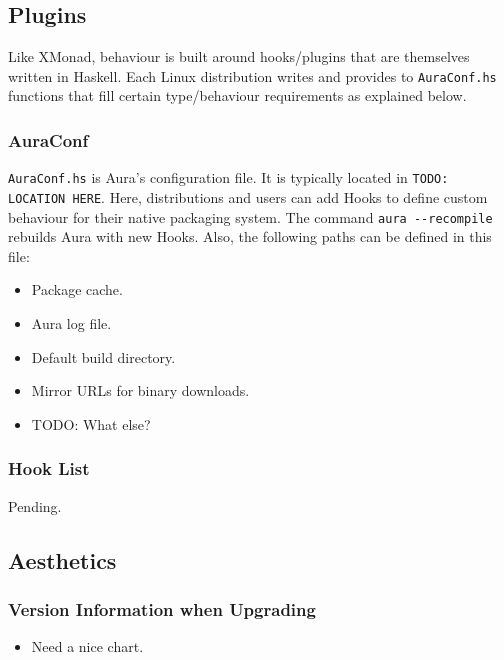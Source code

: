 \documentclass{article}
\begin{document}
\subsection{Plugins}\label{plugins}

Like XMonad, behaviour is built around hooks/plugins that are themselves
written in Haskell. Each Linux distribution writes and provides to
\texttt{AuraConf.hs} functions that fill certain type/behaviour
requirements as explained below.

\subsubsection{AuraConf}\label{auraconf}

\texttt{AuraConf.hs} is Aura's configuration file. It is typically
located in \texttt{TODO: LOCATION HERE}. Here, distributions and users
can add Hooks to define custom behaviour for their native packaging
system. The command \texttt{aura -\/-recompile} rebuilds Aura with new
Hooks. Also, the following paths can be defined in this file:

\begin{itemize}
\itemsep1pt\parskip0pt
\item
  Package cache.
\item
  Aura log file.
\item
  Default build directory.
\item
  Mirror URLs for binary downloads.
\item
  TODO: What else?
\end{itemize}

\subsubsection{Hook List}\label{hook-list}

Pending.

\subsection{Aesthetics}\label{aesthetics}

\subsubsection{Version Information when
Upgrading}\label{version-information-when-upgrading}

\begin{itemize}
\itemsep1pt\parskip0pt
\item
  Need a nice chart.
\end{itemize}
\end{document}
